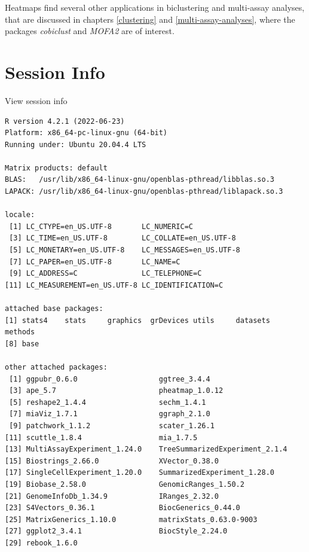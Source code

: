 \documentclass[
]{book}
\begin{document}
Heatmaps find several other applications in biclustering and multi-assay
analyses, that are discussed in chapters \ref{clustering} and
\ref{multi-assay-analyses}, where the packages \emph{cobiclust} and \emph{MOFA2} are of interest.

\hypertarget{session-info-10}{%
\section*{Session Info}\label{session-info-10}}

View session info

\begin{verbatim}
R version 4.2.1 (2022-06-23)
Platform: x86_64-pc-linux-gnu (64-bit)
Running under: Ubuntu 20.04.4 LTS

Matrix products: default
BLAS:   /usr/lib/x86_64-linux-gnu/openblas-pthread/libblas.so.3
LAPACK: /usr/lib/x86_64-linux-gnu/openblas-pthread/liblapack.so.3

locale:
 [1] LC_CTYPE=en_US.UTF-8       LC_NUMERIC=C              
 [3] LC_TIME=en_US.UTF-8        LC_COLLATE=en_US.UTF-8    
 [5] LC_MONETARY=en_US.UTF-8    LC_MESSAGES=en_US.UTF-8   
 [7] LC_PAPER=en_US.UTF-8       LC_NAME=C                 
 [9] LC_ADDRESS=C               LC_TELEPHONE=C            
[11] LC_MEASUREMENT=en_US.UTF-8 LC_IDENTIFICATION=C       

attached base packages:
[1] stats4    stats     graphics  grDevices utils     datasets  methods  
[8] base     

other attached packages:
 [1] ggpubr_0.6.0                   ggtree_3.4.4                  
 [3] ape_5.7                        pheatmap_1.0.12               
 [5] reshape2_1.4.4                 sechm_1.4.1                   
 [7] miaViz_1.7.1                   ggraph_2.1.0                  
 [9] patchwork_1.1.2                scater_1.26.1                 
[11] scuttle_1.8.4                  mia_1.7.5                     
[13] MultiAssayExperiment_1.24.0    TreeSummarizedExperiment_2.1.4
[15] Biostrings_2.66.0              XVector_0.38.0                
[17] SingleCellExperiment_1.20.0    SummarizedExperiment_1.28.0   
[19] Biobase_2.58.0                 GenomicRanges_1.50.2          
[21] GenomeInfoDb_1.34.9            IRanges_2.32.0                
[23] S4Vectors_0.36.1               BiocGenerics_0.44.0           
[25] MatrixGenerics_1.10.0          matrixStats_0.63.0-9003       
[27] ggplot2_3.4.1                  BiocStyle_2.24.0              
[29] rebook_1.6.0                  


\end{verbatim}
\end{document}
